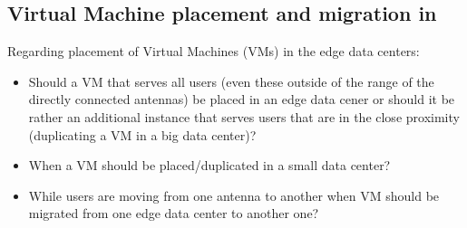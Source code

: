 \subsection{Virtual Machine placement and migration in \xcloud}

Regarding placement of Virtual Machines (VMs) in the edge data centers:
\begin{itemize}
\item Should a VM that serves all users (even these outside of the range of the directly connected antennas) be placed in an edge data cener or should it be rather an additional instance that serves users that are in the close proximity (duplicating a VM in a big data center)?
\item When a VM should be placed/duplicated in a small data center?
\item While users are moving from one antenna to another when VM should be migrated from one edge data center to another one?
\end{itemize}